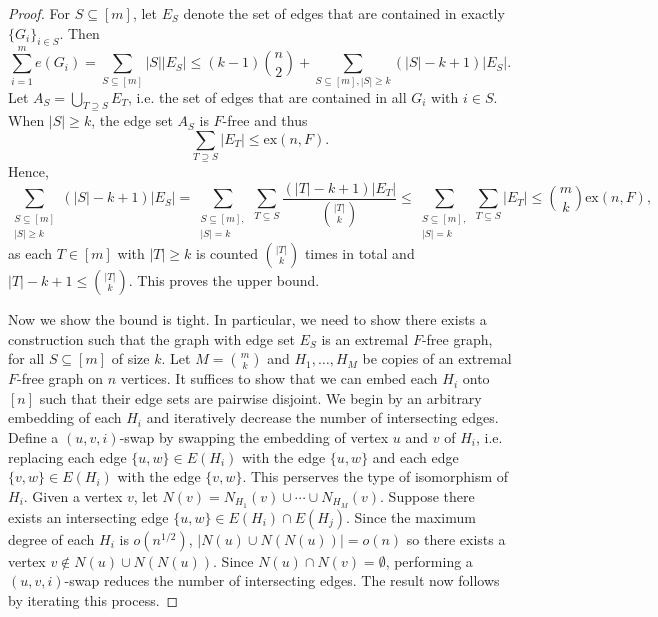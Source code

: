 \documentclass[12pt]{report}
\begin{document}
\begin{proof}
  For $S \subseteq [m]$, let $E_S$ denote the set of edges that are contained in exactly $\{G_i\}_{i
  \in S}$. Then 
  \[
    \sum_{i = 1}^m e(G_i) = \sum_{S \subseteq [m]} |S||E_S| \leq (k - 1)\binom{n}{2} + \sum_{S \subseteq [m], |S| \geq k} (|S| - k + 1)|E_S|.
  \]
  Let $A_S = \bigcup_{T \supseteq S} E_T$, i.e. the set of edges that are contained in all $G_i$
  with $i \in S$. When $|S| \geq k$, the edge set $A_S$ is $F$-free and thus 
  \[
    \sum_{T \supseteq S} |E_T| \leq \text{ex}(n, F).
  \]
  Hence,
  \[
    \sum_{\substack{S \subseteq [m] \\ |S| \geq k}} (|S| - k + 1)|E_S| = \sum_{\substack{S \subseteq [m], \\ |S| = k}} \sum_{T \subseteq S} \frac{(|T| - k + 1)|E_T|}{\binom{|T|}{k}} \leq \sum_{\substack{S \subseteq [m], \\ |S| = k}} \sum_{T \subseteq S} |E_T| \leq \binom{m}{k}\text{ex}(n, F),
  \]
  as each $T \in [m]$ with $|T| \geq k$ is counted $\binom{|T|}{k}$ times in total and $|T| - k + 1
  \leq \binom{|T|}{k}$. This proves the upper bound.

  Now we show the bound is tight. In particular, we need to show there exists a construction such
  that the graph with edge set $E_S$ is an extremal $F$-free graph, for all $S \subseteq [m]$ of
  size $k$. Let $M = \binom{m}{k}$ and $H_1, \ldots, H_M$ be copies of an extremal $F$-free graph on
  $n$ vertices. It suffices to show that we can embed each $H_i$ onto $[n]$ such that their edge
  sets are pairwise disjoint. We begin by an arbitrary embedding of each $H_i$ and iteratively
  decrease the number of intersecting edges. Define a $(u, v, i)$-swap by swapping the embedding of
  vertex $u$ and $v$ of $H_i$, i.e. replacing each edge $\{u, w\} \in E(H_i)$ with the edge $\{u,
  w\}$ and each edge $\{v, w\} \in E(H_i)$ with the edge $\{v, w\}$. This perserves the type of
  isomorphism of $H_i$. Given a vertex $v$, let $N(v) = N_{H_1}(v) \cup \cdots \cup N_{H_M}(v)$.
  Suppose there exists an intersecting edge $\{u, w\} \in E(H_i) \cap E(H_j)$. Since the maximum
  degree of each $H_i$ is $o(n^{1/2})$, $|N(u) \cup N(N(u))| = o(n)$ so there exists a vertex $v
  \notin N(u) \cup N(N(u))$. Since $N(u) \cap N(v) = \emptyset$, performing a $(u, v, i)$-swap
  reduces the number of intersecting edges. The result now follows by iterating this process.
\end{proof}
\end{document}
